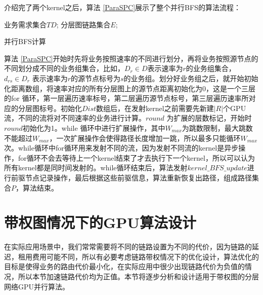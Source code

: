 介绍完了两个kernel之后，算法 \ref{ParaSPC}展示了整个并行BFS的算法流程：
\begin{algorithm}[t]
\begin{algorithmic}[1]
\Require
业务需求集合$TD$;
分层图链路集合$E$;
\Else
{}
\EndIf
{}
\EndFor
\EndFor
\EndFor
\EndFor
{}
\EndFor
{}
\EndWhile
{}
\EndFor
{}
\end{algorithmic}
\caption{{并行BFS计算}}
\label{ParaSPC}
\end{algorithm}
算法 \ref{ParaSPC}开始时先将业务按照速率的不同进行划分，再将业务按照源节点的不同划分成不同的业务组集合，比如，$D_r \in D$表示速率为$r$的业务组集合，$d_{rs} \in D_r$ 表示速率为$r$的源节点标号为$s$的业务组。划分好业务组之后，就开始初始化距离数组，将速率对应的所有分层图上的源节点距离初始化为0，这是一个三层的for 循环，第一层遍历速率标号，第二层遍历源节点标号，第三层遍历速率所对应的分层图标号。初始化$Dist$数组后，在发射kernel之前需要先新建$|R|$个GPU流，不同的流将对不同速率的业务进行计算。$round$ 为扩展的层数标记，开始时$round$初始化为1。while 循环中进行扩展操作，其中$W_{max}$为跳数限制，最大跳数不能超过$W_{max}$，一次扩展操作会使得路径长度增加一跳，所以最多只能循环$W_{max}$次。while循环中for循环用来发射不同的流，因为发射不同流的kernel是异步操作，for循环不会去等待上一个kernel结束了才去执行下一个kernel，所以可以认为所有kernel都是同时间发射的。while循环结束后，算法发射$kernel\_BFS\_update$进行前驱节点记录操作，最后根据这些前驱信息，算法重新恢复出路径，组成路径集合$P$，算法结束。
\section{带权图情况下的GPU算法设计}

在实际应用场景中，我们常常需要将不同的链路设置为不同的代价，因为链路的延迟，租用费用可能不同，所以有必要考虑链路带权情况下的优化设计，算法优化的目标是使得业务的路由代价最小化，在实际应用中很少出现链路代价为负值的情况，所以本节加速链路代价均为正值。本节将逐步分析和设计适用于带权图的分层网络GPU并行算法。
